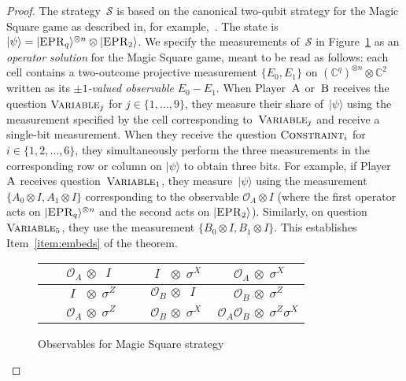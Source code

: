 \documentclass[11pt]{article}
\theoremstyle{definition}
\newcommand{\ket}[1]{|#1\rangle}
\newcommand{\C}{\ensuremath{\mathbb{C}}}
\newcommand{\strategy}{\mathscr{S}}
\newcommand{\labelstyle}[1]{\ensuremath{\textsc{#1}}\xspace}
\newcommand{\EPR}{\labelstyle{EPR}}
\newcommand{\alice}{\labelstyle{A}}
\newcommand{\bob}{\labelstyle{B}}
\newcommand{\typestyle}[1]{\ensuremath{\textsc{#1}}\xspace}
\newcommand{\Constraint}{\typestyle{Constraint}}
\newcommand{\Variable}{\typestyle{Variable}}
\renewcommand{\cal}[1]{\mathcal{#1}}
\begin{document}
\begin{proof}
  The strategy~$\strategy$
  is based on the canonical two-qubit strategy for the Magic Square game as
  described in, for example,~\cite{aravind2002simple}.
  The state is $\ket{\psi} = \ket{\EPR_q}^{\otimes n} \otimes \ket{\EPR_2}$.
  We specify the measurements of~$\strategy$
  in Figure~\ref{fig:ms-operator-soln} as an \emph{operator solution} for the Magic Square game,
  meant to be read as follows:
  each cell contains a two-outcome projective measurement $\{E_0, E_1\}$ on $(\C^q)^{\otimes n} \otimes \C^2$
  written as its \emph{$\pm 1$-valued observable} $E_0 - E_1$.
  When Player~$\alice$ or~$\bob$ receives the question $\Variable_j$ for $j \in \{1, \ldots, 9\}$,
  they measure their share of~$\ket{\psi}$
  using the measurement specified by the cell corresponding to~$\Variable_j$ and receive a single-bit measurement.
  When they receive the question $\Constraint_i$ for $i \in \{1,2,\ldots,6\}$, they
  simultaneously perform the three measurements in the corresponding row or
  column on $\ket{\psi}$ to obtain three bits.
  For example, if Player~$\alice$ receives question~$\Variable_1$,
  they measure~$\ket{\psi}$ using the measurement $\{A_0 \otimes I, A_1 \otimes I\}$
  corresponding to the observable $\cal{O}_A \otimes I$ (where the
  first operator acts on $\ket{\EPR_q}^{\otimes n}$ and the second acts on
  $\ket{\EPR_2}$).
  Similarly, on question~$\Variable_5$,
  they use the measurement $\{B_0 \otimes I, B_1 \otimes I\}$.
  This establishes Item~\ref{item:embeds} of the theorem.
  \begin{figure}[ht!]
    \begin{center}
      \renewcommand{\arraystretch}{2.4}
      \begin{tabularx}{.6\textwidth}{| X | X | X |}
        \hline
        $ \phantom{I\;\;O}\cal{O}_A\, \otimes \; \;I$
        & $ \phantom{\cal{O}_BO} I\;\;\, \otimes \; \sigma^X$
        & $ \phantom{\cal{O}_B\;}\cal{O}_A\, \otimes \; \sigma^X$ \\
        \hline
        $ \phantom{\cal{O}_AO} I\;\;\, \otimes \; \sigma^Z$
        & $ \phantom{I\;\;O}\cal{O}_B\, \otimes \; \;I$
        & $ \phantom{\cal{O}_A\;}\cal{O}_B\, \otimes \; \sigma^Z$ \\
        \hline
        $ \phantom{I\;\;O}\cal{O}_A \, \otimes \; \sigma^Z$
        & $ \phantom{I\;\;O}\cal{O}_B \, \otimes \; \sigma^X$
        & $ \; \cal{O}_A \cal{O}_B \, \otimes \; \sigma^Z \sigma^X$ \\
        \hline
      \end{tabularx}
      \caption{Observables for Magic Square strategy}
      \label{fig:ms-operator-soln}
		\end{center}
  \end{figure}
  

\end{proof}
\end{document}
